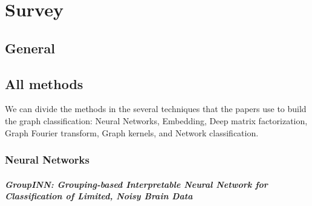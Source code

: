 \chapter{Survey}
\label{chap:1} 
\section{General}
\label{sec:caso}

\section{All methods}
We can divide the methods in the several techniques that the papers use to build the graph classification: Neural Networks, Embedding, Deep matrix factorization, Graph Fourier transform, Graph kernels, and Network classification.
\subsection{Neural Networks}
\paragraph{GroupINN: Grouping-based Interpretable Neural Network for Classification of Limited, Noisy Brain Data}\
\\

